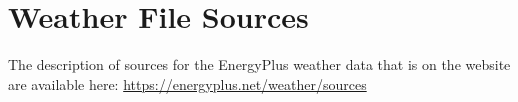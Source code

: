 \section{Weather File Sources}\label{weather-file-sources}

The description of sources for the EnergyPlus weather data that is on the website are available here: \url{https://energyplus.net/weather/sources}
